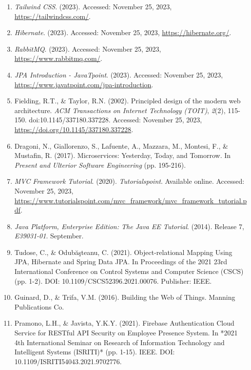 \begin{enumerate}
    \item \textit{Tailwind CSS}. (2023). Accessed: November 25, 2023, \url{https://tailwindcss.com/}.

    \item \textit{Hibernate}. (2023). Accessed: November 25, 2023, \url{https://hibernate.org/}.

    \item \textit{RabbitMQ}. (2023). Accessed: November 25, 2023, \url{https://www.rabbitmq.com/}.

    \item \textit{JPA Introduction - JavaTpoint}. (2023). Accessed: November 25, 2023, \url{https://www.javatpoint.com/jpa-introduction}.

    \item Fielding, R.T., & Taylor, R.N. (2002). Principled design of the modern web architecture. \textit{ACM Transactions on Internet Technology (TOIT)}, \textit{2}(2), 115-150. doi:10.1145/337180.337228. Accessed: November 25, 2023, \url{https://doi.org/10.1145/337180.337228}.

    \item Dragoni, N., Giallorenzo, S., Lafuente, A., Mazzara, M., Montesi, F., & Mustafin, R. (2017). Microservices: Yesterday, Today, and Tomorrow. In \textit{Present and Ulterior Software Engineering} (pp. 195-216).

    \item \textit{MVC Framework Tutorial}. (2020). \textit{Tutorialspoint}. Available online. Accessed: November 25, 2023, \url{https://www.tutorialspoint.com/mvc_framework/mvc_framework_tutorial.pdf}.

    \item \textit{Java Platform, Enterprise Edition: The Java EE Tutorial}. (2014). Release 7, \textit{E39031-01}. September.

    \item Tudose, C., & Odubăşteanu, C. (2021). Object-relational Mapping Using JPA, Hibernate and Spring Data JPA. In Proceedings of the 2021 23rd International Conference on Control Systems and Computer Science (CSCS) (pp. 1-2). DOI: 10.1109/CSCS52396.2021.00076. Publisher: IEEE.

    \item Guinard, D., & Trifa, V.M. (2016). Building the Web of Things. Manning Publications Co.

    \item Pramono, L.H., & Javista, Y.K.Y. (2021). Firebase Authentication Cloud Service for RESTful API Security on Employee Presence System. In *2021 4th International Seminar on Research of Information Technology and Intelligent Systems (ISRITI)* (pp. 1-15). IEEE. DOI: 10.1109/ISRITI54043.2021.9702776.

\end{enumerate}


